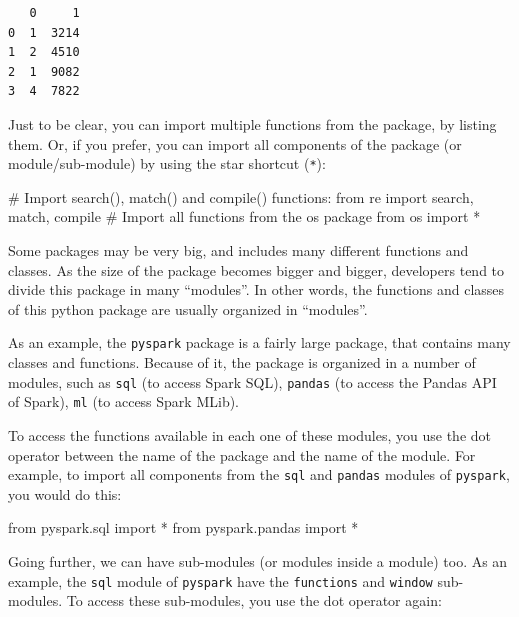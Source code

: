 \documentclass[
  11pt,
  letterpaper,
  DIV=11,
  numbers=noendperiod]{scrreprt}
\newenvironment{Shaded}{\begin{snugshade}}{\end{snugshade}}
\newcommand{\BuiltInTok}[1]{\textcolor[rgb]{0.00,0.23,0.31}{#1}}
\newcommand{\CommentTok}[1]{\textcolor[rgb]{0.37,0.37,0.37}{#1}}
\newcommand{\ImportTok}[1]{\textcolor[rgb]{0.00,0.46,0.62}{#1}}
\newcommand{\NormalTok}[1]{\textcolor[rgb]{0.00,0.23,0.31}{#1}}
\newcommand{\OperatorTok}[1]{\textcolor[rgb]{0.37,0.37,0.37}{#1}}
\begin{document}
\begin{verbatim}
   0     1
0  1  3214
1  2  4510
2  1  9082
3  4  7822
\end{verbatim}

Just to be clear, you can import multiple functions from the package, by
listing them. Or, if you prefer, you can import all components of the
package (or module/sub-module) by using the star shortcut (\texttt{*}):

\begin{Shaded}
\begin{Highlighting}[]
\CommentTok{\# Import \textasciigrave{}search()\textasciigrave{}, \textasciigrave{}match()\textasciigrave{} and \textasciigrave{}compile()\textasciigrave{} functions:}
\ImportTok{from}\NormalTok{ re }\ImportTok{import}\NormalTok{ search, match, }\BuiltInTok{compile}
\CommentTok{\# Import all functions from the \textasciigrave{}os\textasciigrave{} package}
\ImportTok{from}\NormalTok{ os }\ImportTok{import} \OperatorTok{*}
\end{Highlighting}
\end{Shaded}

Some packages may be very big, and includes many different functions and
classes. As the size of the package becomes bigger and bigger,
developers tend to divide this package in many ``modules''. In other
words, the functions and classes of this python package are usually
organized in ``modules''.

As an example, the \texttt{pyspark} package is a fairly large package,
that contains many classes and functions. Because of it, the package is
organized in a number of modules, such as \texttt{sql} (to access Spark
SQL), \texttt{pandas} (to access the Pandas API of Spark), \texttt{ml}
(to access Spark MLib).

To access the functions available in each one of these modules, you use
the dot operator between the name of the package and the name of the
module. For example, to import all components from the \texttt{sql} and
\texttt{pandas} modules of \texttt{pyspark}, you would do this:

\begin{Shaded}
\begin{Highlighting}[]
\ImportTok{from}\NormalTok{ pyspark.sql }\ImportTok{import} \OperatorTok{*}
\ImportTok{from}\NormalTok{ pyspark.pandas }\ImportTok{import} \OperatorTok{*}
\end{Highlighting}
\end{Shaded}

Going further, we can have sub-modules (or modules inside a module) too.
As an example, the \texttt{sql} module of \texttt{pyspark} have the
\texttt{functions} and \texttt{window} sub-modules. To access these
sub-modules, you use the dot operator again:
\end{document}
